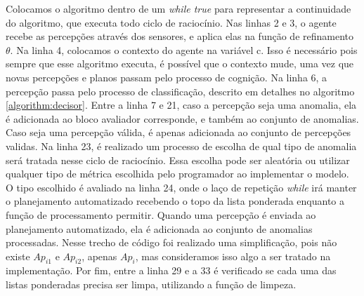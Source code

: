 Colocamos o algoritmo dentro de um \emph{while true} para representar a continuidade do algoritmo, que executa todo ciclo de raciocínio. Nas linhas 2 e 3, o agente recebe as percepções através dos sensores, e aplica elas na função de refinamento $\theta$. Na linha 4, colocamos o contexto do agente na variável c. Isso é necessário pois sempre que esse algoritmo executa, é possível que o contexto mude, uma vez que novas percepções e planos passam pelo processo de cognição. Na linha 6, a percepção passa pelo processo de classificação, descrito em detalhes no algoritmo \ref{algorithm:decisor}. Entre a linha 7 e 21, caso a percepção seja uma anomalia, ela é adicionada ao bloco avaliador corresponde, e também ao conjunto de anomalias. Caso seja uma percepção válida, é apenas adicionada ao conjunto de percepções validas. Na linha 23, é realizado um processo de escolha de qual tipo de anomalia será tratada nesse ciclo de raciocínio. Essa escolha pode ser aleatória ou utilizar qualquer tipo de métrica escolhida pelo programador ao implementar o modelo. O tipo escolhido é avaliado na linha 24, onde o laço de repetição \emph{while} irá manter o planejamento automatizado recebendo o topo da lista ponderada enquanto a função de processamento permitir. Quando uma percepção é enviada ao planejamento automatizado, ela é adicionada ao conjunto de anomalias processadas. Nesse trecho de código foi realizado uma simplificação, pois não existe $Ap_{i1}$ e $Ap_{i2}$, apenas $Ap_{i}$, mas consideramos isso algo a ser tratado na implementação. Por fim, entre a linha 29 e a 33 é verificado se cada uma das listas ponderadas precisa ser limpa, utilizando a função de limpeza.
